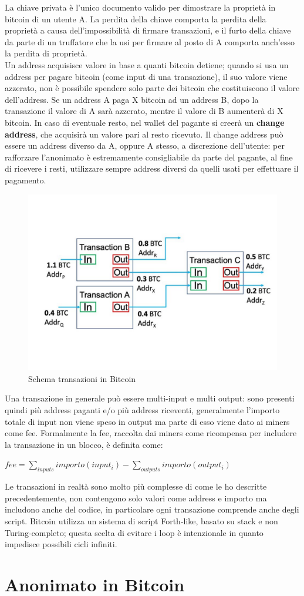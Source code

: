 La chiave privata è l’unico documento valido per dimostrare la proprietà in bitcoin di un utente A.
La perdita della chiave comporta la perdita della proprietà a causa dell’impossibilità di ﬁrmare transazioni, e il furto della chiave da parte di un truﬀatore che la usi per ﬁrmare al posto di A comporta anch’esso la perdita di proprietà.\\Un address acquisisce valore in base a quanti bitcoin detiene; quando si usa un address per pagare bitcoin (come input di una transazione), il suo valore viene azzerato, non è possibile spendere solo parte dei bitcoin che costituiscono il valore dell’address. Se un address A paga X bitcoin ad un address B, dopo la transazione il valore di A sarà azzerato, mentre il valore di B aumenterà di X bitcoin. In caso di eventuale resto, nel wallet del pagante si creerà un \textbf{change address}, che acquisirà un valore pari al resto ricevuto. Il change address può essere un address diverso da A, oppure A stesso, a discrezione dell’utente: per rafforzare l’anonimato è estremamente consigliabile da parte del pagante, al fine di ricevere i resti, utilizzare sempre address diversi da quelli usati per effettuare il pagamento.
\begin{figure}[h!]
    \centering
    \includegraphics[scale=0.4, trim = 1cm 2cm 0cm 3cm, clip]{Images/Transactions-input-and-output-in-blockchain.jpg.pdf}
    \caption{Schema transazioni in Bitcoin}
    \label{fig:transaction}
\end{figure}
\FloatBarrier
Una transazione in generale può essere multi-input e multi output: sono presenti quindi più address paganti e/o più address riceventi, generalmente l'importo totale di input non viene speso in output ma parte di esso viene dato ai miners come fee. Formalmente la fee, raccolta dai miners come ricompensa per includere la transazione in un blocco, è definita come:
\begin{center}
    $fee = \sum_{inputs} importo(input_i) - \sum_{outputs} importo(output_i)$
\end{center}
Le transazioni in realtà sono molto più complesse di come le ho descritte precedentemente, non contengono solo valori come address e importo ma includono anche del codice, in particolare ogni transazione comprende anche degli script. Bitcoin utilizza un sistema di script Forth-like, basato su stack e non Turing-completo; questa scelta di evitare i loop è intenzionale in quanto impedisce possibili cicli infiniti.
\section{Anonimato in Bitcoin}



